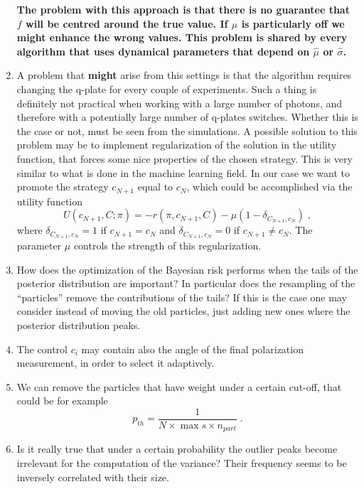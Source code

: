 \documentclass[aps, pra, 10pt, twocolumn, superscriptaddress,floatfix]{revtex4-1}
\begin{document}
\begin{enumerate}
	
\textbf{The problem with this approach is that there is no guarantee that $f$ will be centred around the true value. If $\mu$ is particularly off we might enhance the wrong values. This problem is shared by every algorithm that uses dynamical parameters that depend on $\hat{\mu}$ or $\hat{\sigma}$.} 


	
\item A problem that \textbf{might} arise from this settings is that the algorithm requires changing the q-plate for every couple of experiments. Such a thing is definitely not practical when working with a large number of photons, and therefore with a potentially large number of q-plates switches. Whether this is the case or not, must be seen from the simulations. A possible solution to this problem may be to implement regularization of the solution in the utility function, that forces some nice properties of the chosen strategy. This is very similar to what is done in the machine learning field. In our case we want to promote the strategy $c_{N+1}$ equal to $c_{N}$, which could be accomplished via the utility function
%
\begin{equation}
	U(c_{N+1}, C; \pi) = -r (\pi, c_{N+1}, C) - \mu \left( 1 - \delta_{C_{N+1}, c_N}\right) \; ,
\end{equation}
% 
where $\delta_{C_{N+1}, c_N} = 1$ if $c_{N+1} = c_N$ and $\delta_{C_{N+1}, c_N} = 0$ if $c_{N+1} \neq c_N$. The parameter $\mu$ controls the strength of this regularization. 

\item How does the optimization of the Bayesian risk performs when the tails of the posterior distribution are important? In particular does the resampling of the ``particles'' remove the contributions of the tails? If this is the case one may consider instead of moving the old particles, just adding new ones where the posterior distribution peaks.

\item The control $c_i$ may contain also the angle of the final polarization measurement, in order to select it adaptively.

\item We can remove the particles that have weight under a certain cut-off, that could be for example
%
\begin{equation}
	p_{th} = \frac{1}{N \times \max{s} \times n_{part}} \; .
\end{equation}
%

\item Is it really true that under a certain probability the outlier peaks become irrelevant for the computation of the variance? Their frequency seems to be inversely correlated with their size.


\end{enumerate}
\end{document}
